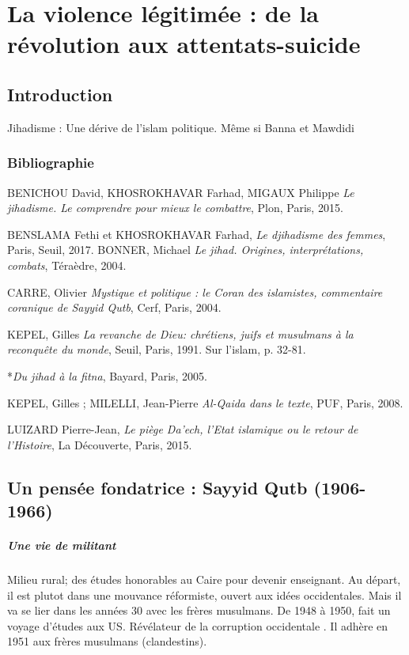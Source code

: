 \chapter{La violence légitimée : de la
révolution aux attentats-suicide}

 

\section{Introduction}


Jihadisme : Une dérive de l'islam politique. Même si Banna et Mawdidi

\subsection{Bibliographie}

BENICHOU David, KHOSROKHAVAR Farhad, MIGAUX Philippe \emph{Le jihadisme.
Le comprendre pour mieux le combattre}, Plon, Paris, 2015.

BENSLAMA Fethi et KHOSROKHAVAR Farhad, \emph{Le djihadisme des femmes},
Paris, Seuil, 2017. BONNER, Michael \emph{Le jihad. Origines,
interprétations, combats}, Téraèdre, 2004.

CARRE, Olivier \emph{Mystique et politique : le Coran des islamistes,
commentaire coranique de Sayyid Qutb}, Cerf, Paris, 2004.

KEPEL, Gilles \emph{La revanche de Dieu: chrétiens, juifs et musulmans à
la reconquête du monde}, Seuil, Paris, 1991. Sur l'islam, p. 32-81.

*\emph{Du jihad à la fitna}, Bayard, Paris, 2005.

KEPEL, Gilles ; MILELLI, Jean-Pierre \emph{Al-Qaida dans le texte}, PUF,
Paris, 2008.

LUIZARD Pierre-Jean, \emph{Le piège Da'ech, l'Etat islamique ou le
retour de l'Histoire}, La Découverte, Paris, 2015.





 
  \section{Un pensée fondatrice : Sayyid Qutb (1906-1966)}



   
    \paragraph{Une vie de militant} Milieu rural; des études honorables au Caire pour devenir enseignant. Au départ, il est plutot dans une mouvance réformiste, ouvert aux idées occidentales. Mais il va se lier dans les années 30 avec les frères musulmans. De 1948 à 1950, fait un voyage d'études aux US. Révélateur de la corruption occidentale . Il adhère en 1951 aux frères musulmans (clandestins). 
    
